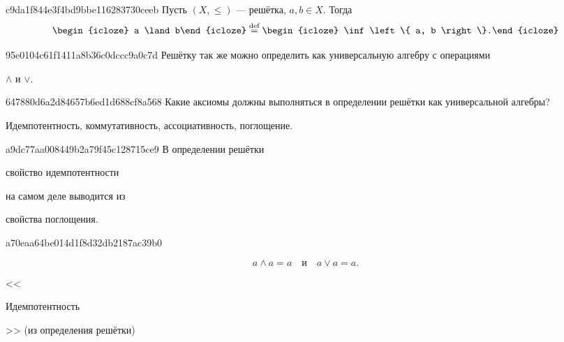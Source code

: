\begin{note}{c9da1f844e3f4bd9bbe116283730ceeb}
    Пусть \({ (X, \leqslant) }\) --- решётка, \({ a, b \in X }\).
    Тогда
    \[
        \begin{icloze}{2}a \land b\end{icloze} \overset{\text{def}}= \begin{icloze}{1}\inf \left\{ a, b \right\}.\end{icloze}
    \]
\end{note}

\begin{note}{95e0104c61f1411a8b36c0dccc9a0c7d}
    Решётку так же можно определить как универсальную алгебру с операциями \begin{icloze}{1}\({ \land }\) и \({ \lor }\).\end{icloze}
\end{note}

\begin{note}{647880d6a2d84657b6ed1d688cf8a568}
    Какие аксиомы должны выполняться в определении решётки как универсальной алгебры?

    \begin{cloze}{1}
        Идемпотентность, коммутативность, ассоциативность, поглощение.
    \end{cloze}
\end{note}

\begin{note}{a9dc77aa008449b2a79f45c128715ce9}
    В определении решётки \begin{icloze}{1}свойство идемпотентности\end{icloze} на самом деле выводится из \begin{icloze}{2}свойства поглощения.\end{icloze}
\end{note}

\begin{note}{a70eaa64be014d1f8d32db2187ac39b0}
    \begin{icloze}{1}
        \[
            a \land a = a \quad \text{и} \quad a \lor a = a.
        \]
    \end{icloze}

    \begin{center}
        \tiny
        <<\begin{icloze}{2}Идемпотентность\end{icloze}>> (из определения решётки)
    \end{center}
\end{note}

